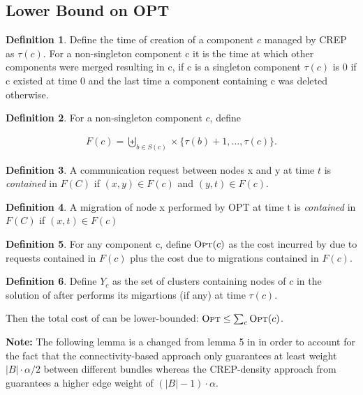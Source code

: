 \documentclass[xcolor=dvipsnames, tikz, 12pt]{article}
\newcommand{\nl}{\newline}
\newcommand{\crep}{C{\scriptsize REP}}
\newcommand{\opt}{\text{O{\scriptsize PT}}}
\theoremstyle{definition}
\newtheorem{defi}{Definition}
\begin{document}
	\subsection{Lower Bound on OPT}
	\begin{defi}
		Define the time of creation of a component $c$ managed by \crep{} as $\tau(c)$. For a non-singleton component c it is the time at which other components were merged resulting in c, if c is a singleton component $\tau(c)$ is 0 if c existed at time 0 and the last time a component containing c was deleted otherwise.
	\end{defi}
	\begin{defi}
		For a non-singleton component $c$, define
	\end{defi}
	\begin{align*}
	F(c)=\biguplus_{b\in S(c)}\times \{\tau(b)+1,...,\tau(c)\}.
	\end{align*}
	
	\begin{defi}
		A communication request between nodes x and y at time $t$ is \textit{contained} in $F(C)$ if $(x,y)\in F(c)$ and $(y,t)\in F(c)$.
	\end{defi}

	\begin{defi}
		A migration of node x performed by OPT at time t is \textit{contained} in $F(C)$ if $(x,t)\in F(c)$
	\end{defi}

	\begin{defi}
		For any component c, define $\opt{}(c)$ as the cost incurred by \opt{} due to requests contained in $F(c)$ plus the cost due to migrations contained in $F(c)$.
	\end{defi}

	\begin{defi}
		Define $Y_c$ as the set of clusters containing nodes of $c$ in the solution of \opt after \opt performs its migartions (if any) at time $\tau(c)$.
	\end{defi}
	Then the total cost of \opt can be lower-bounded: $\opt\leq\sum_c \opt(c)$.\nl\nl	
	
	\textbf{Note:} The following lemma is a changed from lemma 5 in \cite{Avin2015} in order to account for the fact that the connectivity-based approach only guarantees at least weight $|B|\cdot\alpha/2$ between different bundles whereas the \crep{}-density approach from \cite{Avin2015} guarantees a higher edge weight of $(|B|-1)\cdot\alpha$.
\end{document}
